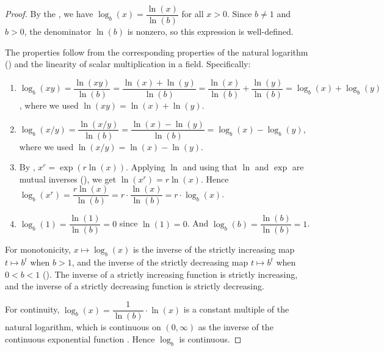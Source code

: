 \begin{proof}
    By the , we have $\log_b(x) = \dfrac{\ln(x)}{\ln(b)}$ for all $x > 0$. Since $b \neq 1$ and $b > 0$, the denominator $\ln(b)$ is nonzero, so this expression is well-defined.

    The properties follow from the corresponding properties of the natural logarithm () and the linearity of scalar multiplication in a field. Specifically:

    \begin{enumerate}
        \item $\log_b(xy) = \dfrac{\ln(xy)}{\ln(b)} = \dfrac{\ln(x) + \ln(y)}{\ln(b)} = \dfrac{\ln(x)}{\ln(b)} + \dfrac{\ln(y)}{\ln(b)} = \log_b(x) + \log_b(y)$, where we used $\ln(xy) = \ln(x) + \ln(y)$.

        \item $\log_b(x/y) = \dfrac{\ln(x/y)}{\ln(b)} = \dfrac{\ln(x) - \ln(y)}{\ln(b)} = \log_b(x) - \log_b(y)$, where we used $\ln(x/y) = \ln(x) - \ln(y)$.

        \item By , $x^r = \exp(r \ln(x))$. Applying $\ln$ and using that $\ln$ and $\exp$ are mutual inverses (), we get $\ln(x^r) = r \ln(x)$. Hence $\log_b(x^r) = \dfrac{r \ln(x)}{\ln(b)} = r \cdot \dfrac{\ln(x)}{\ln(b)} = r \cdot \log_b(x)$.

        \item $\log_b(1) = \dfrac{\ln(1)}{\ln(b)} = 0$ since $\ln(1) = 0$. And $\log_b(b) = \dfrac{\ln(b)}{\ln(b)} = 1$.
    \end{enumerate}

    For monotonicity, $x \mapsto \log_b(x)$ is the inverse of the strictly increasing map $t \mapsto b^t$ when $b > 1$, and the inverse of the strictly decreasing map $t \mapsto b^t$ when $0 < b < 1$ (). The inverse of a strictly increasing function is strictly increasing, and the inverse of a strictly decreasing function is strictly decreasing.

    For continuity, $\log_b(x) = \dfrac{1}{\ln(b)} \cdot \ln(x)$ is a constant multiple of the natural logarithm, which is continuous on $(0, \infty)$ as the inverse of the continuous exponential function . Hence $\log_b$ is continuous.
\end{proof}

